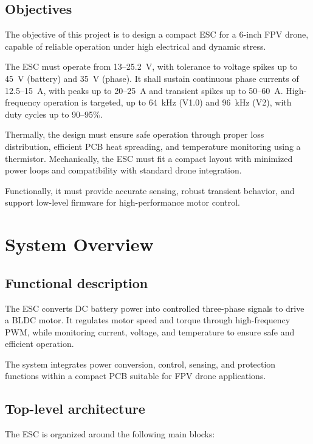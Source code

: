 \documentclass[11pt,a4paper]{article}
\begin{document}
\subsection{Objectives}

The objective of this project is to design a compact ESC for a 6-inch FPV drone, capable of reliable operation under high electrical and dynamic stress.

The ESC must operate from 13--25.2~V, with tolerance to voltage spikes up to 45~V (battery) and 35~V (phase). It shall sustain continuous phase currents of 12.5--15~A, with peaks up to 20--25~A and transient spikes up to 50--60~A. 
High-frequency operation is targeted, up to 64~kHz (V1.0) and 96~kHz (V2), with duty cycles up to 90--95\%.

Thermally, the design must ensure safe operation through proper loss distribution, efficient PCB heat spreading, and temperature monitoring using a thermistor. Mechanically, the ESC must fit a compact layout with minimized power loops and compatibility with standard drone integration.

Functionally, it must provide accurate sensing, robust transient behavior, and support low-level firmware for high-performance motor control.

\section{System Overview}
\label{sec:overview}

\subsection{Functional description}

The ESC converts DC battery power into controlled three-phase signals to drive a BLDC motor. It regulates motor speed and torque through high-frequency PWM, while monitoring current, voltage, and temperature to ensure safe and efficient operation.

The system integrates power conversion, control, sensing, and protection functions within a compact PCB suitable for FPV drone applications.

\subsection{Top-level architecture}

The ESC is organized around the following main blocks:
\end{document}
